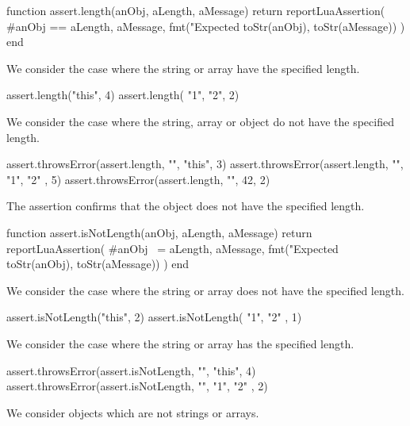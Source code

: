 \startLuaCode
function assert.length(anObj, aLength, aMessage)
  return reportLuaAssertion(
    #anObj == aLength,
    aMessage,
    fmt("Expected %
      toStr(anObj), toStr(aMessage))
  )
end
\stopLuaCode


We consider the case where the string or array have the specified length. 

\startLuaTest
  assert.length("this", 4)
  assert.length({ "1", "2"}, 2)
\stopLuaTest
\stopTestCase


We consider the case where the string, array or object do not have the 
specified length. 

\startLuaTest
  assert.throwsError(assert.length, "", "this", 3)
  assert.throwsError(assert.length, "", { "1", "2" }, 5)
  assert.throwsError(assert.length, "", 42, 2)
\stopLuaTest
\stopTestCase

\stopTestSuite


The  assertion confirms that the object does not 
have the specified length. 

\startLuaCode
function assert.isNotLength(anObj, aLength, aMessage)
  return reportLuaAssertion(
    #anObj ~= aLength,
    aMessage,
    fmt("Expected %
      toStr(anObj), toStr(aMessage))
  )
end
\stopLuaCode


We consider the case where the string or array does not have the specified 
length.

\startLuaTest
  assert.isNotLength("this", 2)
  assert.isNotLength({ "1", "2" }, 1)
\stopLuaTest
\stopTestCase


We consider the case where the string or array has the specified length. 

\startLuaTest
  assert.throwsError(assert.isNotLength, "", "this", 4)
  assert.throwsError(assert.isNotLength, "", { "1", "2" }, 2)
\stopLuaTest
\stopTestCase


We consider objects which are not strings or arrays.

